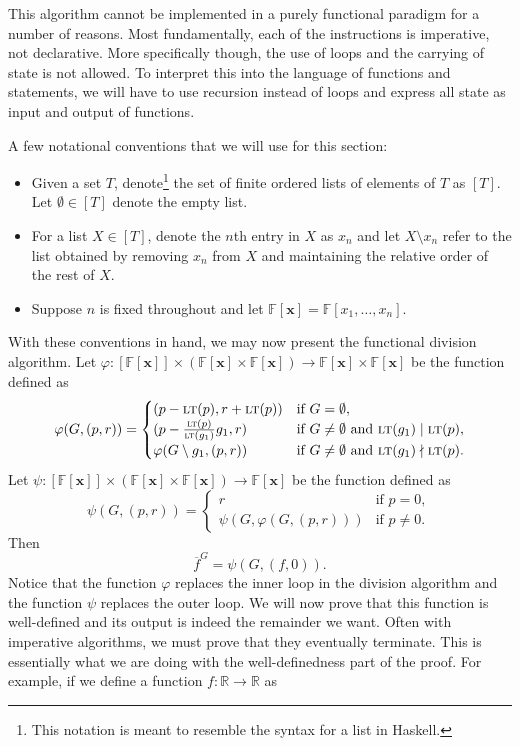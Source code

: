\documentclass[MS, xcolor=dvipsnames]{wfuthesis}
\def\bF{\mathbb{F}}
\def\bR{\mathbb{R}}
\newcommand{\LT}{\ensuremath{\text{\sc lt}}}
\def\and{\text{ and }}
\theoremstyle{definition}
\def\p{\varphi}
\begin{document}
This algorithm cannot be implemented in a purely functional paradigm for a number of reasons. Most fundamentally, each of the instructions is imperative, not declarative. More specifically though, the use of loops and the carrying of state is not allowed. To interpret this into the language of functions and statements, we will have to use recursion instead of loops and express all state as input and output of functions. \par
A few notational conventions that we will use for this section:
\begin{itemize}
  \item Given a set $T$, denote\footnote{This notation is meant to resemble the syntax for a list in Haskell.} the set of finite ordered lists of elements of $T$ as $[T]$. Let $\emptyset \in [T]$ denote the empty list.
  \item For a list $X \in [T]$, denote the $n$th entry in $X$ as $x_n$ and let $X \setminus x_n$ refer to the list obtained by removing $x_n$ from $X$ and maintaining the relative order of the rest of $X$.
  \item Suppose $n$ is fixed throughout and let $\bF[\mathbf x] = \bF[x_1,\dots,x_n]$.
\end{itemize}
With these conventions in hand, we may now present the functional division algorithm. Let $\p: [\bF[\mathbf x]] \times \left( \bF[\mathbf x] \times \bF[\mathbf x] \right) \to \bF[\mathbf x] \times \bF[\mathbf x]$ be the function defined as
\[ \p(G,(p,r)) = \begin{cases} (p-\LT(p),r+\LT(p)) &\text{if } G = \emptyset, \\ (p-\frac{\LT(p)}{\LT(g_1)}g_1,r) &\text{if } G \ne \emptyset \and \LT(g_1) \mid \LT(p), \\ \p(G\setminus g_1,(p,r)) &\text{if } G \ne \emptyset \and \LT(g_1) \nmid \LT(p). \end{cases} \]
Let $\psi: [\bF[\mathbf x]] \times \left( \bF[\mathbf x] \times \bF[\mathbf x] \right) \to \bF[\mathbf x]$ be the function defined as
\[ \psi(G,(p,r)) = \begin{cases} r &\text{if } p = 0, \\ \psi(G,\p(G,(p,r))) &\text{if } p \ne 0. \end{cases} \]
Then
\[ \overline f^{G} = \psi(G,(f,0)). \]
Notice that the function $\p$ replaces the inner loop in the division algorithm and the function $\psi$ replaces the outer loop. We will now prove that this function is well-defined and its output is indeed the remainder we want. Often with imperative algorithms, we must prove that they eventually terminate. This is essentially what we are doing with the well-definedness part of the proof. For example, if we define a function $f: \bR \to \bR$ as
\end{document}
